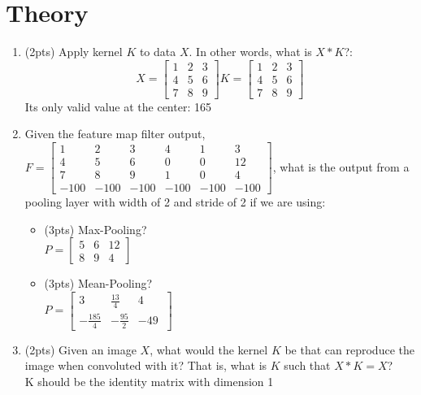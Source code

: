 \documentclass[12pt]{article}
\begin{document}
\maketitle

\section{Theory}
\begin{enumerate}
\item (2pts) Apply kernel $K$ to data $X$.  In other words, what is $X*K$?:\\
$$X=\begin{bmatrix}
1&2&3\\
4&5&6\\
7 & 8 & 9
\end{bmatrix}
K=\begin{bmatrix}
1&2&3\\
4&5&6\\
7 & 8 & 9
\end{bmatrix}
$$
Its only valid value at the center: 165

\item Given the feature map filter output, $F=\begin{bmatrix}
1&2&3&4&1&3\\
4&5&6&0&0&12\\
7 & 8 & 9 & 1 & 0 & 4\\
-100 & -100 & -100 & -100 & -100 & -100
\end{bmatrix}$, what is the output from a pooling layer with width of 2 and stride of 2 if we are using:
	\begin{itemize}
		\item (3pts) Max-Pooling?\\
		$P=\begin{bmatrix}
           5&6&12\\
		8&9&4\
		\end{bmatrix}$
		\item (3pts) Mean-Pooling?\\
		$P=\begin{bmatrix}
           3&\frac{13}{4}&4\\
		-\frac{185}{4}&-\frac{95}{2}&-49\
		\end{bmatrix}$
	\end{itemize}
\item (2pts) Given an image $X$, what would the kernel $K$ be that can reproduce the image when convoluted with it?  That is, what is $K$ such that $X*K=X$?\\
K should be the identity matrix with dimension 1
\end{enumerate}
\end{document}
